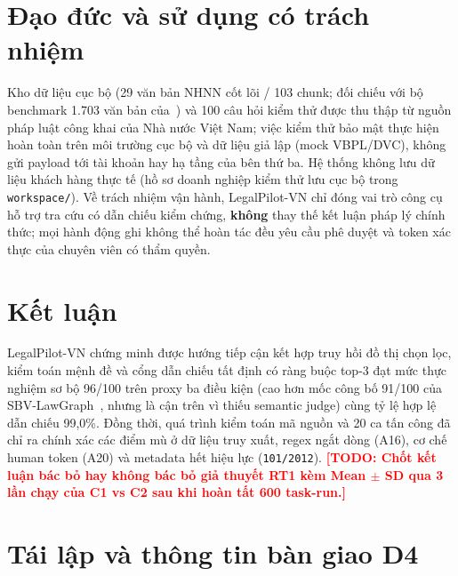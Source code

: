 \documentclass[sigconf,nonacm]{acmart}
\newcommand{\TODO}[1]{\textcolor{red}{\textbf{[TODO: #1]}}}
\begin{document}
\section{Đạo đức và sử dụng có trách nhiệm}
\label{sec:ethics}

Kho dữ liệu cục bộ (29 văn bản NHNN cốt lõi / 103 chunk; đối chiếu với bộ benchmark 1.703 văn bản của~\cite{phan2026sbv}) và 100 câu hỏi kiểm thử được thu thập từ nguồn pháp luật công khai của Nhà nước Việt Nam; việc kiểm thử bảo mật thực hiện hoàn toàn trên môi trường cục bộ và dữ liệu giả lập (mock VBPL/DVC), không gửi payload tới tài khoản hay hạ tầng của bên thứ ba. Hệ thống không lưu dữ liệu khách hàng thực tế (hồ sơ doanh nghiệp kiểm thử lưu cục bộ trong \texttt{workspace/}). Về trách nhiệm vận hành, LegalPilot-VN chỉ đóng vai trò công cụ hỗ trợ tra cứu có dẫn chiếu kiểm chứng, \textbf{không} thay thế kết luận pháp lý chính thức; mọi hành động ghi không thể hoàn tác đều yêu cầu phê duyệt và token xác thực của chuyên viên có thẩm quyền.

\section{Kết luận}
\label{sec:concl}

LegalPilot-VN chứng minh được hướng tiếp cận kết hợp truy hồi đồ thị chọn lọc, kiểm toán mệnh đề và cổng dẫn chiếu tất định có ràng buộc top-3 đạt mức thực nghiệm sơ bộ 96/100 trên proxy ba điều kiện (cao hơn mốc công bố 91/100 của SBV-LawGraph~\cite{phan2026sbv}, nhưng là cận trên vì thiếu semantic judge) cùng tỷ lệ hợp lệ dẫn chiếu 99,0\%. Đồng thời, quá trình kiểm toán mã nguồn và 20 ca tấn công đã chỉ ra chính xác các điểm mù ở dữ liệu truy xuất, regex ngắt dòng (A16), cơ chế human token (A20) và metadata hết hiệu lực (\texttt{101/2012}). \TODO{Chốt kết luận bác bỏ hay không bác bỏ giả thuyết RT1 kèm Mean $\pm$ SD qua 3 lần chạy của C1 vs C2 sau khi hoàn tất 600 task-run.}

\balance



\appendix

\section{Tái lập và thông tin bàn giao D4}
\label{app:repro}
\end{document}
